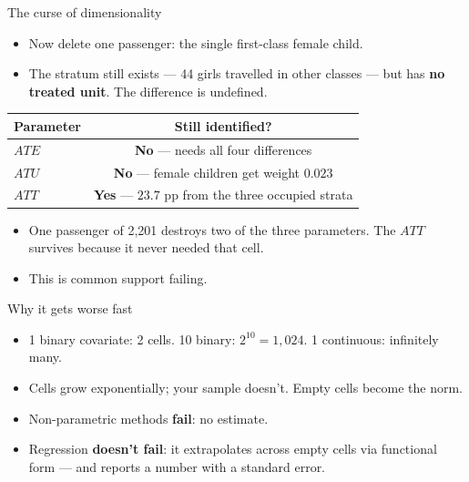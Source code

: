 \documentclass[
  11pt,
  ignorenonframetext,
  aspectratio=169,
]{beamer}
\providecommand{\tightlist}{%
  \setlength{\itemsep}{0pt}\setlength{\parskip}{0pt}}
\begin{document}
\begin{frame}{The curse of dimensionality}
\protect{}\label{the-curse-of-dimensionality}
\begin{itemize}
\tightlist
\item
  Now delete one passenger: the single first-class female child.
\item
  The stratum still exists --- 44 girls travelled in other classes ---
  but has \textbf{no treated unit}. The difference is undefined.
\end{itemize}

\begin{center}
\begin{tabular}{lc}
\toprule
Parameter & Still identified? \\
\midrule
$ATE$ & \textbf{No} --- needs all four differences \\
$ATU$ & \textbf{No} --- female children get weight $0.023$ \\
$ATT$ & \textbf{Yes} --- $23.7$ pp from the three occupied strata \\
\bottomrule
\end{tabular}
\end{center}

\vspace{0.4em}

\begin{itemize}
\tightlist
\item
  One passenger of 2,201 destroys two of the three parameters. The
  \(ATT\) survives because it never needed that cell.
\item
  This is common support failing.
\end{itemize}
\end{frame}

\begin{frame}{Why it gets worse fast}
\protect{}\label{why-it-gets-worse-fast}
\begin{itemize}
\tightlist
\item
  1 binary covariate: 2 cells. 10 binary: \(2^{10} = 1{,}024\). 1
  continuous: infinitely many.
\item
  Cells grow exponentially; your sample doesn't. Empty cells become the
  norm.
\item
  Non-parametric methods \textbf{fail}: no estimate.
\item
  Regression \textbf{doesn't fail}: it extrapolates across empty cells
  via functional form --- and reports a number with a standard error.
\end{itemize}
\end{frame}
\end{document}
